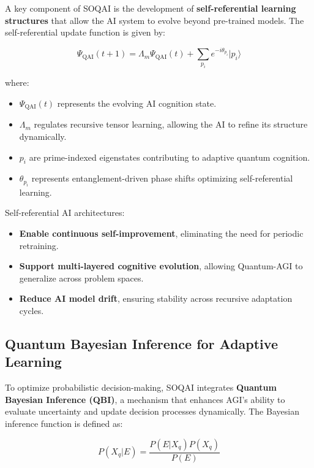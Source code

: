\documentclass{article}
\theoremstyle{plain}
\begin{document}
A key component of SOQAI is the development of \textbf{self-referential learning structures} that allow the AI system to evolve beyond pre-trained models. The self-referential update function is given by:

\begin{equation}
    \Psi_{\text{QAI}}(t+1) = \Lambda_m \Psi_{\text{QAI}}(t) + \sum_{p_i} e^{-i\theta_{p_i}} |p_i\rangle
\end{equation}

where:
\begin{itemize}
    \item \( \Psi_{\text{QAI}}(t) \) represents the evolving AI cognition state.
    \item \( \Lambda_m \) regulates recursive tensor learning, allowing the AI to refine its structure dynamically.
    \item \( p_i \) are prime-indexed eigenstates contributing to adaptive quantum cognition.
    \item \( \theta_{p_i} \) represents entanglement-driven phase shifts optimizing self-referential learning.
\end{itemize}

Self-referential AI architectures:
\begin{itemize}
    \item \textbf{Enable continuous self-improvement}, eliminating the need for periodic retraining.
    \item \textbf{Support multi-layered cognitive evolution}, allowing Quantum-AGI to generalize across problem spaces.
    \item \textbf{Reduce AI model drift}, ensuring stability across recursive adaptation cycles.
\end{itemize}

\subsection{Quantum Bayesian Inference for Adaptive Learning}

To optimize probabilistic decision-making, SOQAI integrates \textbf{Quantum Bayesian Inference (QBI)}, a mechanism that enhances AGI’s ability to evaluate uncertainty and update decision processes dynamically. The Bayesian inference function is defined as:

\begin{equation}
    P(X_q | E) = \frac{P(E | X_q) P(X_q)}{P(E)}
\end{equation}
\end{document}
